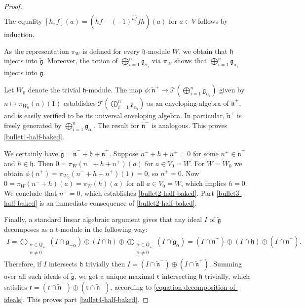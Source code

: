 \documentclass[12pt, a4paper, reqno]{amsart}
\def\TT{\mathcal{T}}
\theoremstyle{definition}
\theoremstyle{definition}
\theoremstyle{definition}
\numberwithin{theorem}{section}
\numberwithin{lemma}{section}
\numberwithin{remark}{section}
\numberwithin{definition}{section}
\numberwithin{corollary}{section}
\numberwithin{proposition}{section}
\numberwithin{example}{section}
\begin{document}
\begin{proof}
\begin{align*}
		\end{align*}
		The equality \([h,f](a) = (hf-(-1)^{\bar{h}\bar{f}}fh)(a)\) for \(a \in V\) follows by induction. \par
		As the representation \(\pi_W\) is defined for every \(\mathfrak{h}\)-module \(W\), we obtain that \(\mathfrak{h}\) injects into \(\tilde{\mathfrak{g}}\). Moreover, the action of \(\bigoplus_{i=1}^n \mathfrak{g}_{\alpha_i}\) via \(\pi_W\) shows that  \(\bigoplus_{i=1}^n \mathfrak{g}_{\alpha_i}\) injects into \(\tilde{\mathfrak{g}}\). \par
		Let \(W_0\) denote the trivial \(\mathfrak{h}\)-module. The map \(\phi:\tilde{\mathfrak{n}}^+ \rightarrow \TT(\bigoplus_{i=1}^n \mathfrak{g}_{\alpha_i})\) given by \(n \mapsto \pi_{W_0}(n)(1)\) establishes \(\TT(\bigoplus_{i=1}^n \mathfrak{g}_{\alpha_i})\) as an enveloping algebra of \(\tilde{\mathfrak{n}}^+\), and is easily verified to be its universal enveloping algebra. In particular, \(\tilde{\mathfrak{n}}^+\) is freely generated by \(\bigoplus_{i=1}^n \mathfrak{g}_{\alpha_i}\). The result for \(\tilde{\mathfrak{n}}^-\) is analogous. This proves \ref{bullet1-half-baked}. \par
		We certainly have \(\tilde{\mathfrak{g}} = \tilde{\mathfrak{n}}^- + \mathfrak{h} + \tilde{\mathfrak{n}}^+\). Suppose \(n^- + h + n^+ = 0\) for some \(n^\pm \in \tilde{\mathfrak{n}}^{\pm}\) and \(h\in \mathfrak{h}\). Then \(0 = \pi_W(n^-+h+n^+)(a)\) for \(a \in V_0 = W\). For \(W = W_0\) we obtain \(\phi(n^+) = \pi_{W_0}(n^-+h+n^+)(1) = 0\), so \(n^+ = 0\). Now \(0 = \pi_W(n^-+h)(a) = \pi_W(h)(a)\) for all \(a \in V_0 = W\), which implies \(h = 0\). We conclude that \(n^- = 0\), which establishes \ref{bullet2-half-baked}. Part \ref{bullet3-half-baked} is an immediate consequence of \ref{bullet2-half-baked}. \par
		Finally, a standard linear algebraic argument gives that any ideal \(I\) of \(\tilde{\mathfrak{g}}\) decomposes as a \(\mathfrak{t}\)-module in the following way:
		\begin{align}\label{equation-decomposition-of-ideals}
			I = \bigoplus_{\substack{\alpha \in Q_+ \\ \alpha \neq 0}}(I\cap\tilde{\mathfrak{g}}_{-\alpha}) \oplus (I\cap \mathfrak{h}) \oplus \bigoplus_{\substack{\alpha \in Q_+ \\ \alpha \neq 0}}(I\cap\tilde{\mathfrak{g}}_{\alpha}) = (I\cap \tilde{\mathfrak{n}}^-) \oplus (I\cap \mathfrak{h}) \oplus (I\cap \tilde{\mathfrak{n}}^+).
		\end{align}
		Therefore, if \(I\) intersects \(\mathfrak{h}\) trivially then \(I = (I\cap \tilde{\mathfrak{n}}^-) \oplus (I\cap \tilde{\mathfrak{n}}^+) \). Summing over all such ideals of \(\tilde{\mathfrak{g}}\), we get a unique maximal \(\mathfrak{r}\) intersecting \(\mathfrak{h}\) trivially, which satisfies \(\mathfrak{r} = (\mathfrak{r}\cap\tilde{\mathfrak{n}}^-)\oplus(\mathfrak{r}\cap\tilde{\mathfrak{n}}^+)\), according to \eqref{equation-decomposition-of-ideals}. This proves part \ref{bullet4-half-baked}.
	\end{proof}
	
\end{document}

